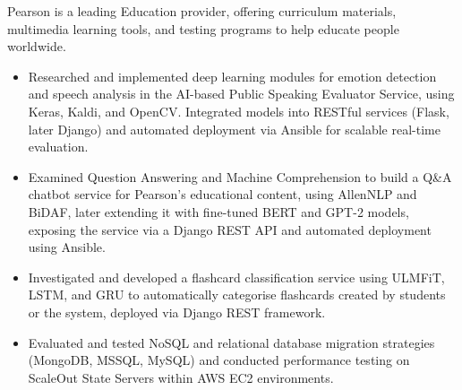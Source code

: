 \documentclass[12pt,a4paper,withhyper]{altacv}
\begin{document}
\divider{}

Pearson is a leading Education provider, offering curriculum materials, multimedia learning tools, and testing programs to help educate people worldwide.
\medskip
\begin{itemize}
    \item Researched and implemented deep learning modules for emotion detection and speech analysis in the AI-based Public Speaking Evaluator Service, using Keras, Kaldi, and OpenCV. Integrated models into RESTful services (Flask, later Django) and automated deployment via Ansible for scalable real-time evaluation.

    \item Examined Question Answering and Machine Comprehension to build a Q\&A chatbot service for Pearson’s educational content, using AllenNLP and BiDAF, later extending it with fine-tuned BERT and GPT-2 models, exposing the service via a Django REST API and automated deployment using Ansible.

    \item Investigated and developed a flashcard classification service using ULMFiT, LSTM, and GRU to automatically categorise flashcards created by students or the system, deployed via Django REST framework.

    \item Evaluated and tested NoSQL and relational database migration strategies (MongoDB, MSSQL, MySQL) and conducted performance testing on ScaleOut State Servers within AWS EC2 environments.

\end{itemize}

\medskip

\end{document}
